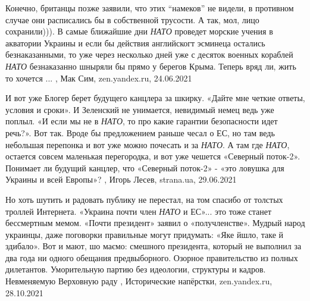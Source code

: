 Конечно, британцы позже заявили, что этих \enquote{намеков} не видели, в противном
случае они расписались бы в собственной трусости. А так, мол, лицо
сохранили))). В самые ближайшие дни \emph{НАТО} проведет морские учения в акватории
Украины и если бы действия английскогт эсминеца остались безнаказанными, то уже
через несколько дней уже с десяток военных кораблей \emph{НАТО} безнаказанно шныряли
бы прямо у берегов Крыма. Теперь вряд ли, жить то хочется ...
, 
Мак Сим, zen.yandex.ru, 24.06.2021

И вот уже Блогер берет будущего канцлера за шкирку. «Дайте мне четкие ответы,
условия и сроки». И Зеленский не унимается, невидимый немец ведь уже поплыл. «И
если мы не в \emph{НАТО}, то про какие гарантии безопасности идет речь?». Вот так.
Вроде бы предложением раньше чесал о ЕС, но там ведь небольшая перепонка и вот
уже можно почесать и за \emph{НАТО}. А там где \emph{НАТО}, остается совсем маленькая
перегородка, и вот уже чешется «Северный поток-2». Понимает ли будущий канцлер,
что «Северный поток-2» - «это ловушка для Украины и всей Европы»?
, 
Игорь Лесев, strana.ua, 29.06.2021

Но хоть шутить и радовать публику не перестал, на том спасибо от толстых
троллей Интернета. «Украина почти член \emph{НАТО} и ЕС»... это тоже станет
бессмертным мемом. «Почти президент» заявил о «получленстве».  Мудрый народ
украинцы, даже поговорки правильные могут придумать: «Яке йшло, таке й
здибало». Вот и мают, шо маємо: смешного президента, который не выполнил за два
года ни одного обещания предвыборного. Озорное правительство из полных
дилетантов. Уморительную партию без идеологии, структуры и кадров. Невменяемую
Верховную раду
, 
Исторические напёрстки, zen.yandex.ru, 28.10.2021
